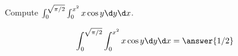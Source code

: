 \documentclass{ximera}
\author{David Guichard \and Neal Koblitz \and H. Jerome Keisler \and Albert Scheller \and Barry Balof \and Mike Wills \and Matthew Carr}
\begin{document}
\begin{exercise}




Compute $\int_{0}^{\sqrt{\pi/2}}\int_{0}^{x^2}x\cos y \d y\d x$.
\begin{prompt}
\[
\int_{0}^{\sqrt{\pi/2}}\int_{0}^{x^2}x\cos y \d y\d x=\answer{1/2}
\]
\end{prompt}



\end{exercise}
\end{document}
